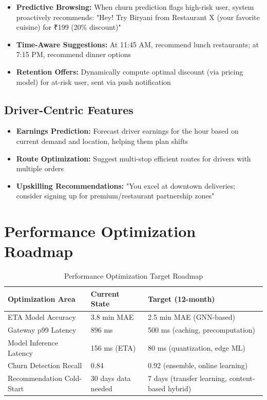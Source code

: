 \documentclass[12pt,a4paper]{report}
\begin{document}
\begin{itemize}
\begin{itemize}
    \item \textbf{Predictive Browsing:} When churn prediction flags high-risk user, system proactively recommends: "Hey! Try Biryani from Restaurant X (your favorite cuisine) for ₹199 (20\% discount)"
    \item \textbf{Time-Aware Suggestions:} At 11:45 AM, recommend lunch restaurants; at 7:15 PM, recommend dinner options
    \item \textbf{Retention Offers:} Dynamically compute optimal discount (via pricing model) for at-risk user, sent via push notification
\end{itemize}

\subsection{Driver-Centric Features}

\begin{itemize}
    \item \textbf{Earnings Prediction:} Forecast driver earnings for the hour based on current demand and location, helping them plan shifts
    \item \textbf{Route Optimization:} Suggest multi-stop efficient routes for drivers with multiple orders
    \item \textbf{Upskilling Recommendations:} "You excel at downtown deliveries; consider signing up for premium/restaurant partnership zones"
\end{itemize}

\section{Performance Optimization Roadmap}

\begin{table}[H]
\centering
\caption{Performance Optimization Target Roadmap}
\begin{tabular}{p{3.5cm} p{2.5cm} p{2.5cm}}
\toprule
\textbf{Optimization Area} & \textbf{Current State} & \textbf{Target (12-month)} \\
\midrule
ETA Model Accuracy & 3.8 min MAE & 2.5 min MAE (GNN-based) \\
Gateway p99 Latency & 896 ms & 500 ms (caching, precomputation) \\
Model Inference Latency & 156 ms (ETA) & 80 ms (quantization, edge ML) \\
Churn Detection Recall & 0.84 & 0.92 (ensemble, online learning) \\
Recommendation Cold-Start & 30 days data needed & 7 days (transfer learning, content-based hybrid) \\
\bottomrule
\end{tabular}
\end{table}


\end{itemize}
\end{document}
